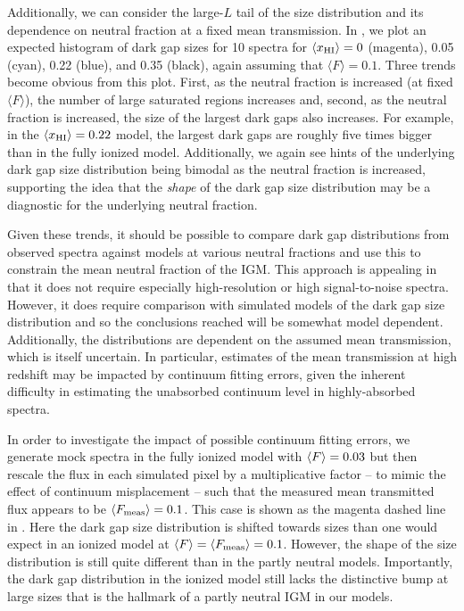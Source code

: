 Additionally, we can consider the large-$L$ tail of the size distribution and its dependence on neutral fraction at a fixed mean transmission. In , we plot an expected histogram of dark gap sizes for 10 spectra for  $\langle x_{\text{HI}}\rangle = 0$ (magenta), 0.05 (cyan), 0.22 (blue), and 0.35 (black), again assuming that $\langle F \rangle = 0.1$. Three trends become obvious from this plot. First, as the neutral fraction is increased (at fixed $\langle F \rangle $), the number of large saturated regions increases and, second, as the neutral fraction is increased, the size of the largest dark gaps also increases. For example, in the $\langle x_{\text{HI}}\rangle = 0.22$ model, the largest dark gaps are roughly five times bigger than in the fully ionized model. Additionally, we again see hints of the underlying dark gap size distribution being bimodal as the neutral fraction is increased, supporting the idea that the \textit{shape} of the dark gap size distribution may be a diagnostic for the underlying neutral fraction.


Given these trends, it should be possible to compare dark gap distributions from observed spectra against models at various neutral fractions and use this to constrain the mean neutral fraction of the IGM. This approach is appealing in that it does not require especially high-resolution or high signal-to-noise spectra. However, it does require comparison with simulated models 
of the dark gap
size distribution and so the conclusions reached will be somewhat model dependent.
Additionally, the distributions are dependent on the assumed mean transmission, which is itself uncertain. In particular, estimates of the mean transmission at high redshift may be impacted by continuum
fitting errors, given the inherent difficulty in estimating the unabsorbed continuum level in highly-absorbed spectra.


In order to investigate the impact of possible continuum fitting errors, we generate mock spectra in the fully ionized model with $\langle F \rangle=0.03$ but then rescale the flux in each simulated
pixel by a multiplicative factor -- to mimic the effect of continuum misplacement -- such that the measured mean transmitted flux appears to be $\langle F_{\text{meas}} \rangle = 0.1$. This case is shown as
the magenta dashed line in . Here the dark gap size distribution is shifted towards sizes than one would expect in an ionized model at $\langle F \rangle=\langle F_{\text{meas}} \rangle = 0.1$.
However, the shape of the size distribution is still quite different than in the partly neutral models. Importantly, the dark gap distribution in the ionized model still lacks the distinctive bump at large
sizes that is the hallmark of a partly neutral IGM in our models. 


